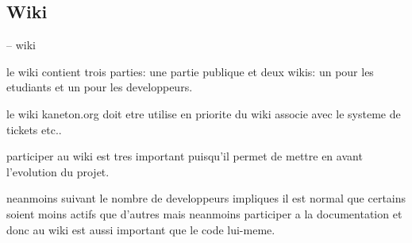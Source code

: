 %
%
%
%
%
%

%
%

\subsection{Wiki}

-- wiki

le wiki contient trois parties: une partie publique et deux wikis: un pour
les etudiants et un pour les developpeurs.

le wiki kaneton.org doit etre utilise en priorite du wiki associe avec
le systeme de tickets etc..

participer au wiki est tres important puisqu'il permet de mettre en avant
l'evolution du projet.

neanmoins suivant le nombre de developpeurs impliques il est normal que
certains soient moins actifs que d'autres mais neanmoins participer a
la documentation et donc au wiki est aussi important que le code lui-meme.

